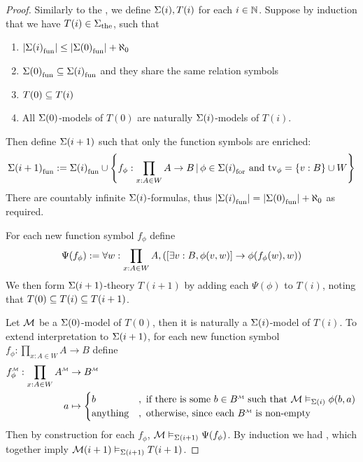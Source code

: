 \begin{proof}
    Similarly to the , 
    we define $\Sigma(i), T(i)$ for each $i \in \mathbb{N}$.
    Suppose by induction that we have $T(i) \in {\Sigma}_\mathrm{the}$, 
    such that 
    \begin{enumerate}
        \item $|{\Sigma(i)}_\mathrm{fun}| \leq |{\Sigma(0)}_\mathrm{fun}| + \aleph_0$
        \item ${\Sigma(0)}_\mathrm{fun} \subseteq {\Sigma(i)}_\mathrm{fun}$
            and they share the same relation symbols
        \item $T(0) \subseteq T(i)$
        \item All $\Sigma(0)$-models of $T(0)$ are naturally 
            $\Sigma(i)$-models of $T(i)$.
    \end{enumerate} 
    Then define $\Sigma(i+1)$ such that only the function symbols are enriched:
    \[
        {\Sigma(i+1)}_\mathrm{fun} := {\Sigma(i)}_\mathrm{fun} \cup 
        \left\{f_{\phi} : \prod_{x : A \in W} A \to B \,|\, \phi \in {\Sigma(i)}_\mathrm{for} 
        \text{ and } \textrm{tv}_{\phi} = \left\{v : B\right\} \cup W\right\}
    \]   
    There are countably infinite $\Sigma(i)$-formulas, 
    thus $|{\Sigma(i)}_\mathrm{fun}| = |{\Sigma(0)}_\mathrm{fun}| + \aleph_0$ as required.

    For each new function symbol $f_\phi$ define 
    \[
        \Psi(f_\phi) := 
            \forall w : \prod_{x : A \in W} A , 
            \left(\left[\exists v : B, \phi(v,w)\right] \to \phi(f_\phi(w),w)\right)   
    \]
    We then form $\Sigma(i+1)$-theory $T(i+1)$ 
    by adding each $\Psi(\phi)$ to $T(i)$,
    noting that $T(0) \subseteq T(i) \subseteq T(i+1)$.

    Let $\mathcal{M}$ be a $\Sigma(0)$-model of $T(0)$, 
    then it is naturally a $\Sigma(i)$-model of $T(i)$.
    To extend interpretation to $\Sigma(i+1)$,
    for each new function symbol $f_\phi : \prod_{x : A \in W} A \to B$ define
    \begin{align*}
        \mmintp{f_\phi} : 
        \prod_{x : A \in W} \mmintp{A} &\to \mmintp{B}\\
        a &\mapsto \begin{cases}
            b &, \text{ if there is some } b \in \mmintp{B} \text{ such that }
            \MM \model{\Si(i)} \phi(b,a)\\
            \text{anything} &, \text{ otherwise, since each } 
            \mmintp{B} \text{ is non-empty}
        \end{cases}\\
    \end{align*}
    Then by construction for each $f_\phi$, 
    $\mathcal{M} \vDash_{\Sigma(i+1)} \Psi(f_\phi)$.
    By induction we had ,
    which together imply $\mathcal{M}(i+1) \vDash_{\Sigma(i+1)} T(i+1)$.
    

\end{proof}
